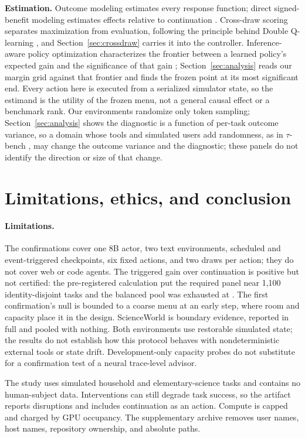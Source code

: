 \textbf{Estimation.} Outcome modeling estimates every response function; direct signed-benefit modeling estimates effects relative to continuation \citep{kunzel2019metalearners}. Cross-draw scoring separates maximization from evaluation, following the principle behind Double Q-learning \citep{vanhasselt2010double}, and Section~\ref{sec:crossdraw} carries it into the controller. Inference-aware policy optimization characterizes the frontier between a learned policy's expected gain and the significance of that gain \citep{bastani2025inference}; Section~\ref{sec:analysis} reads our margin grid against that frontier and finds the frozen point at its most significant end. Every action here is executed from a serialized simulator state, so the estimand is the utility of the frozen menu, not a general causal effect or a benchmark rank. Our environments randomize only token sampling; Section~\ref{sec:analysis} shows the diagnostic is a function of per-task outcome variance, so a domain whose tools and simulated users add randomness, as in $\tau$-bench \citep{yao2024taubench}, may change the outcome variance and the diagnostic; these panels do not identify the direction or size of that change.

\section{Limitations, ethics, and conclusion}

\paragraph{Limitations.} The confirmations cover one 8B actor, two text environments, scheduled and event-triggered checkpoints, six fixed actions, and two draws per action; they do not cover web or code agents. The triggered gain over continuation is positive but not certified: the pre-registered calculation put the required panel near 1,100 identity-disjoint tasks and the balanced pool was exhausted at \EventPlanned{}. The first confirmation's null is bounded to a coarse menu at an early step, where room and capacity place it in the design. ScienceWorld is boundary evidence, reported in full and pooled with nothing. Both environments use restorable simulated state; the results do not establish how this protocol behaves with nondeterministic external tools or state drift. Development-only capacity probes do not substitute for a confirmation test of a neural trace-level advisor.

The study uses simulated household and elementary-science tasks and contains no human-subject data. Interventions can still degrade task success, so the artifact reports disruptions and includes continuation as an action. Compute is capped and charged by GPU occupancy. The supplementary archive removes user names, host names, repository ownership, and absolute paths.

